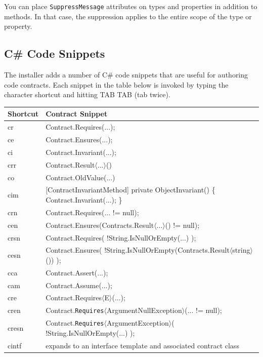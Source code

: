 \documentclass{article}
\newcommand{\code}[1]{\lstinline{#1}}
\newcommand{\csharp}{C\#}
\newcommand{\requires}[1]{\code{Requires}$\langle$#1$\rangle$}
\newcommand{\requiresn}[1]{{Requires}$\langle$#1$\rangle$}
\begin{document}
You can place \code{SuppressMessage} attributes on types and
properties in addition to methods. In that case, the suppression
applies to the entire scope of the type or property.

\subsection{C\# Code Snippets}

The installer adds a number of \csharp{} code snippets that are useful
for authoring code contracts. Each snippet in the table below is
invoked by typing the character shortcut and hitting TAB TAB (tab
twice).
\begin{center}
\codefamily
\begin{tabular}{|l|l|}
\hline
Shortcut & Contract Snippet \\
\hline
\hline
cr & Contract.Requires(...);
\\
\hline
ce & Contract.Ensures(...);
\\
\hline
ci & Contract.Invariant(...);
\\
\hline
crr & Contract.Result$\langle$...$\rangle$()
\\
\hline
co & Contract.OldValue(...)
\\
\hline
cim & \multicolumn{1}{p{6cm}|}{
\raggedright
[ContractInvariantMethod]\linebreak
private ObjectInvariant() \{ \linebreak
\hspace*{5mm} Contract.Invariant(...); \linebreak
\}}
\\
\hline
crn & Contract.Requires(... != null);
\\
\hline
cen & Contract.Ensures(Contracts.Result$\langle$...$\rangle$() != null);
\\
\hline
crsn & Contract.Requires( !String.IsNullOrEmpty(...) );
\\
\hline
cesn & Contract.Ensures( !String.IsNullOrEmpty(Contracts.Result$\langle$string$\rangle$()) );
\\
\hline
cca & Contract.Assert(...);
\\
\hline
cam & Contract.Assume(...);
\\
\hline
cre & Contract.\requiresn{E}(...);
\\
\hline
cren & Contract.\requires{ArgumentNullException}(... != null);
\\
\hline
cresn & Contract.\requires{ArgumentException}( !String.IsNullOrEmpty(...) );
\\
\hline
cintf & expands to an interface template and associated contract class
\\
\hline
\end{tabular}
\end{center}
\end{document}
